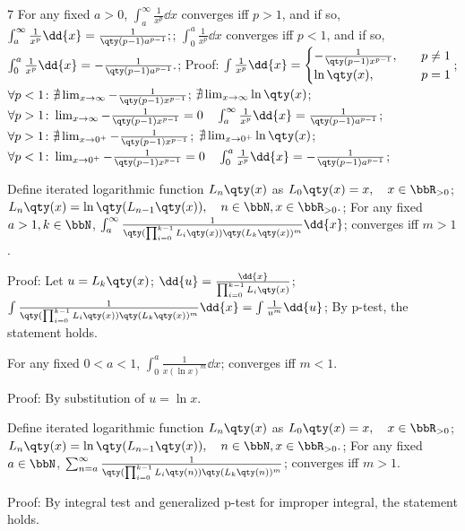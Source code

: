 \documentclass[a4paper,10pt]{extarticle}
\begin{document}
\begin{multicols}{7}
For any fixed $a>0$, $\int_a^{\infty}\frac{1}{x^p}\dd{x}$ converges iff $p>1$, and if so,
\(\int_a^{\infty}\frac{1}{x^p}\dd{x}=\frac{1}{\qty(p-1)a^{p-1}};\); 
$\int_0^a\frac{1}{x^p}\dd{x}$ converges iff $p<1$, and if so,
\(\int_0^a\frac{1}{x^p}\dd{x}=-\frac{1}{\qty(p-1)a^{p-1}}.\); 
Proof:
\(\int\frac{1}{x^p}\dd{x}=\begin{cases}
-\frac{1}{\qty(p-1)x^{p-1}},\quad&p\neq 1\\
\ln\qty(x),\quad&p=1
\end{cases}\); 
\(\forall p<1\colon\nexists\lim_{x\to\infty}-\frac{1}{\qty(p-1)x^{p-1}}\); 
\(\nexists\lim_{x\to\infty}\ln\qty(x)\); 
\(\forall p>1\colon\lim_{x\to\infty}-\frac{1}{\qty(p-1)x^{p-1}}=0\quad\int_a^{\infty}\frac{1}{x^p}\dd{x}=\frac{1}{\qty(p-1)a^{p-1}}\); 
\(\forall p>1\colon\nexists\lim_{x\to 0^+}-\frac{1}{\qty(p-1)x^{p-1}}\); 
\(\nexists\lim_{x\to 0^+}\ln\qty(x)\); 
\(\forall p<1\colon\lim_{x\to 0^+}-\frac{1}{\qty(p-1)x^{p-1}}=0\quad\int_0^a\frac{1}{x^p}\dd{x}=-\frac{1}{\qty(p-1)a^{p-1}}\); 


Define iterated logarithmic function $L_n\qty(x)$ as
\(L_{0}\qty(x)=x,\quad x\in\bbR_{>0}\); 
\(L_{n}\qty(x)=\ln\qty(L_{n-1}\qty(x)),\quad n\in\bbN,x\in\bbR_{>0}.\); 
For any fixed $a>1,k\in\bbN$,
\(\int_a^{\infty}\frac{1}{\qty(\prod_{i=0}^{k-1}L_{i}\qty(x))\qty(L_{k}\qty(x))^m}\dd{x}\); 
converges iff $m>1$.

Proof:
Let
\(u=L_k\qty(x)\); 
\(\dd{u}=\frac{\dd{x}}{\prod_{i=0}^{k-1}L_{i}\qty(x)}\); 
\(\int\frac{1}{\qty(\prod_{i=0}^{k-1}L_{i}\qty(x))\qty(L_{k}\qty(x))^m}\dd{x}=\int\frac{1}{u^m}\dd{u}\); 
By p-test, the statement holds.

For any fixed $0<a<1$,
\(\int_0^a\frac{1}{x(\ln x)^m}\dd{x}\); 
converges iff $m<1$.

Proof:
By substitution of $u=\ln x$.



Define iterated logarithmic function $L_n\qty(x)$ as
\(L_{0}\qty(x)=x,\quad x\in\bbR_{>0}\); 
\(L_{n}\qty(x)=\ln\qty(L_{n-1}\qty(x)),\quad n\in\bbN,x\in\bbR_{>0}.\); 
For any fixed $a\in\bbN$,
\(\sum_{n=a}^{\infty}\frac{1}{\qty(\prod_{i=0}^{k-1}L_{i}\qty(n))\qty(L_{k}\qty(n))^m}\); 
converges iff $m>1$.

Proof:
By integral test and generalized p-test for improper integral, the statement holds.




\end{multicols}
\end{document}
